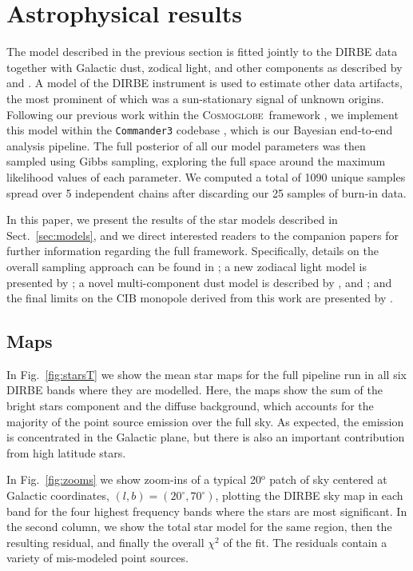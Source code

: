\documentclass{aa}
\def\Cosmoglobe{\textsc{Cosmoglobe}}
\begin{document}
\section{Astrophysical results}
\label{sec:results}

The model described in the previous section is fitted jointly to the DIRBE data together with Galactic dust, zodical light, and other components as described by \citet{CG02_01} and \citep{CG02_07}. A model of the DIRBE instrument is used to estimate other data artifacts, the most prominent of which was a sun-stationary signal of unknown origins. Following our previous work within the \Cosmoglobe\ framework \citep{bp01, watts2023_dr1}, we implement this model within the \texttt{Commander3} codebase \citep{bp03}, which is our Bayesian end-to-end analysis pipeline. The full posterior of all our model parameters was then sampled using Gibbs sampling, exploring the full space around the maximum likelihood values of each parameter. We computed a total of 1090 unique samples spread over 5 independent chains after discarding our 25 samples of burn-in data. 

In this paper, we present the results of the star models described in Sect.~\ref{sec:models}, and we direct interested readers to the companion papers for further information regarding the full framework. Specifically, details on the overall sampling approach can be found in \citet{CG02_01}; a new zodiacal light model is presented by \citet{CG02_02}; a novel multi-component dust model is described by \citet{CG02_05}, \citet{CG02_06} and \citet{CG02_07}; and the final limits on the CIB monopole derived from this work are presented by \citet{CG02_03}. 


\subsection{Maps}

In Fig.~\ref{fig:starsT} we show the mean star maps for the full pipeline run in all six DIRBE bands where they are modelled. Here, the maps show the sum of the bright stars component and the diffuse background, which accounts for the  majority of the point source emission over the full sky. As expected, the emission is concentrated in the Galactic plane, but there is also an important contribution from high latitude stars.

In Fig.~\ref{fig:zooms} we show zoom-ins of a typical 20$^\mathrm{o}$ patch of sky centered at Galactic coordinates, $(l,b) = (20^\circ, 70^\circ)$, plotting the DIRBE sky map in each band for the four highest frequency bands where the stars are most significant. In the second column, we show the total star model for the same region, then the resulting residual, and finally the overall $ \chi^2$ of the fit. The residuals contain a variety of mis-modeled point sources.
\end{document}
